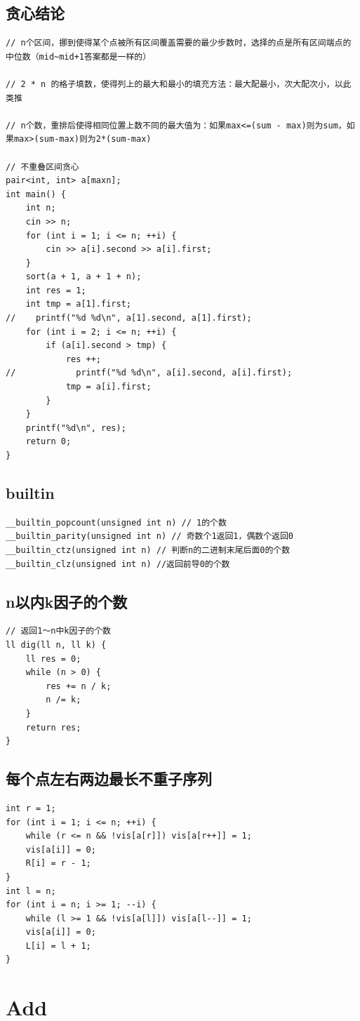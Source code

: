\documentclass[twoside]{article}
\begin{document}
\subsection{贪心结论}
\begin{lstlisting}
// n个区间，挪到使得某个点被所有区间覆盖需要的最少步数时，选择的点是所有区间端点的中位数（mid~mid+1答案都是一样的）

// 2 * n 的格子填数，使得列上的最大和最小的填充方法：最大配最小，次大配次小，以此类推

// n个数，重排后使得相同位置上数不同的最大值为：如果max<=(sum - max)则为sum，如果max>(sum-max)则为2*(sum-max)

// 不重叠区间贪心
pair<int, int> a[maxn];
int main() {
    int n;
    cin >> n;
    for (int i = 1; i <= n; ++i) {
        cin >> a[i].second >> a[i].first;
    }
    sort(a + 1, a + 1 + n);
    int res = 1;
    int tmp = a[1].first;
//    printf("%d %d\n", a[1].second, a[1].first);
    for (int i = 2; i <= n; ++i) {
        if (a[i].second > tmp) {
            res ++;
//            printf("%d %d\n", a[i].second, a[i].first);
            tmp = a[i].first;
        }
    }
    printf("%d\n", res);
    return 0;
}
\end{lstlisting}
\subsection{builtin}
\begin{lstlisting}
__builtin_popcount(unsigned int n) // 1的个数
__builtin_parity(unsigned int n) // 奇数个1返回1，偶数个返回0
__builtin_ctz(unsigned int n) // 判断n的二进制末尾后面0的个数
__builtin_clz(unsigned int n) //返回前导0的个数
\end{lstlisting}
\subsection{n以内k因子的个数}
\begin{lstlisting}
// 返回1～n中k因子的个数
ll dig(ll n, ll k) {
    ll res = 0;
    while (n > 0) {
        res += n / k;
        n /= k;
    }
    return res;
}
\end{lstlisting}
\subsection{每个点左右两边最长不重子序列}
\begin{lstlisting}
int r = 1;
for (int i = 1; i <= n; ++i) {
    while (r <= n && !vis[a[r]]) vis[a[r++]] = 1;
    vis[a[i]] = 0;
    R[i] = r - 1;
}
int l = n;
for (int i = n; i >= 1; --i) {
    while (l >= 1 && !vis[a[l]]) vis[a[l--]] = 1;
    vis[a[i]] = 0;
    L[i] = l + 1;
}\end{lstlisting}
\clearpage\section{Add}
\end{document}
